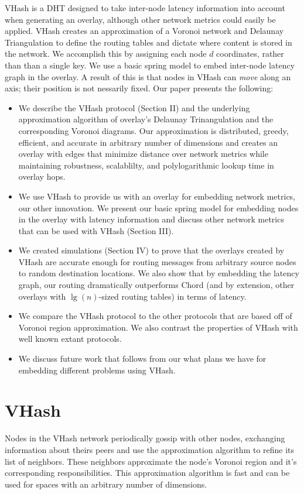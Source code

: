 \documentclass{IEEEtran}
\begin{document}
VHash is a DHT designed to take inter-node latency information into account when generating an overlay, although other network metrics could easily be applied.  VHash creates an approximation of a Voronoi network and Delaunay Triangulation to define the routing tables and dictate where content is stored in the network.  We accomplish this by assigning each node $d$ coordinates, rather than than a single key.  We use a basic spring model to embed inter-node latency graph in the overlay. A result of this is that nodes in VHash  can \emph{move} along an axis;  their position is not nessarily fixed.
Our paper presents the following:
\begin{itemize}
	\item We describe the VHash protocol (Section II) and the underlying approximation algorithm of overlay's Delaunay Trinangulation and the corresponding Voronoi diagrams.   Our approximation is distributed, greedy, efficient, and accurate in arbitrary number of dimensions and creates an overlay with edges that minimize distance over network metrics while maintaining robustness, scalablilty, and polylogarithmic lookup time in overlay hops.
	\item We use VHash to provide us with an overlay for embedding network metrics, our other innovation.  We present our basic spring model for embedding nodes in the overlay with latency information and discuss other network metrics that can be used with VHash (Section III).
	\item We created simulations (Section IV) to prove that the overlays created by VHash are accurate enough for routing messages from arbitrary source nodes to random destination locations.  We also show that by embedding the latency graph, our routing dramatically outperforms Chord (and by extension, other overlays with $\lg(n)$-sized routing tables) in terms of latency.
	\item We compare the VHash protocol to the other protocols that are based off of Voronoi region approximation.  We also contrast the properties of VHash with well known extant protocols.
	\item We discuss future work that follows from our what plans we have for embedding different problems using VHash.
\end{itemize}


\section{VHash}
Nodes in the VHash network periodically gossip with other nodes, exchanging information about theirs peers and use the approximation algorithm to refine its list of neighbors.
These neighbors approximate the node's Voronoi region and it's corresponding responsibilities.
This approximation algorithm is fast and can be used for spaces with an arbitrary number of dimensions.
\end{document}
